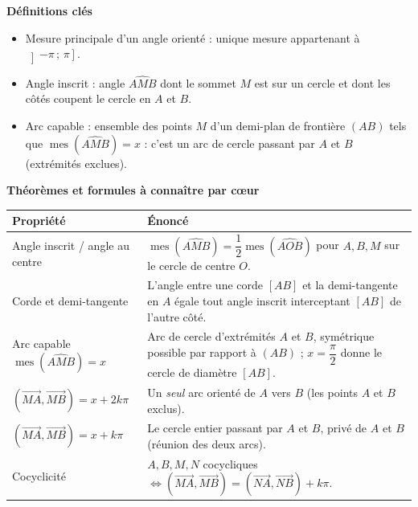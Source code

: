 \documentclass[11pt]{article}
\newcommand{\cle}[1]{{\popxbold\color{popdark}#1}}
\begin{document}
\begin{bilan}
\textbf{Définitions clés}
\begin{itemize}
  \item \cle{Mesure principale} d'un angle orienté : unique mesure appartenant à $\left]-\pi\,;\,\pi\right]$.
  \item \cle{Angle inscrit} : angle $\widehat{AMB}$ dont le sommet $M$ est sur un cercle et dont les côtés coupent le cercle en $A$ et $B$.
  \item \cle{Arc capable} : ensemble des points $M$ d'un demi-plan de frontière $(AB)$ tels que $\operatorname{mes}(\widehat{AMB})=x$ : c'est un arc de cercle passant par $A$ et $B$ (extrémités exclues).
\end{itemize}

\textbf{Théorèmes et formules à connaître par c\oe ur}
\begin{center}
\begin{tabularx}{\linewidth}{|l|X|}
\hline
\rowcolor{popblueL} \textbf{Propriété} & \textbf{Énoncé} \\
\hline
Angle inscrit / angle au centre & $\operatorname{mes}(\widehat{AMB})=\dfrac{1}{2}\operatorname{mes}(\widehat{AOB})$ pour $A,B,M$ sur le cercle de centre $O$. \\
\hline
Corde et demi-tangente & L'angle entre une corde $[AB]$ et la demi-tangente en $A$ égale tout angle inscrit interceptant $[AB]$ de l'autre côté. \\
\hline
Arc capable $\operatorname{mes}(\widehat{AMB})=x$ & Arc de cercle d'extrémités $A$ et $B$, symétrique possible par rapport à $(AB)$ ; $x=\dfrac{\pi}{2}$ donne le cercle de diamètre $[AB]$. \\
\hline
$(\overrightarrow{MA},\overrightarrow{MB})=x+2k\pi$ & Un \emph{seul} arc orienté de $A$ vers $B$ (les points $A$ et $B$ exclus). \\
\hline
$(\overrightarrow{MA},\overrightarrow{MB})=x+k\pi$ & Le cercle entier passant par $A$ et $B$, privé de $A$ et $B$ (réunion des deux arcs). \\
\hline
Cocyclicité & $A,B,M,N$ cocycliques $\iff (\overrightarrow{MA},\overrightarrow{MB})=(\overrightarrow{NA},\overrightarrow{NB})+k\pi$. \\
\hline
\end{tabularx}
\end{center}


\end{bilan}
\end{document}

